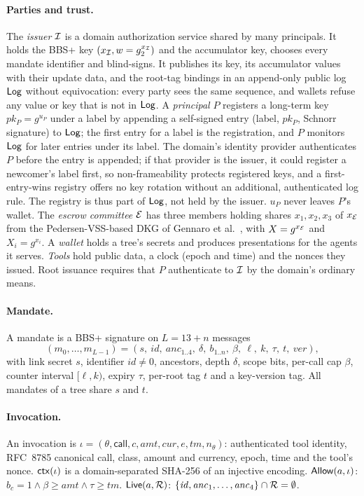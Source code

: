 \paragraph{Parties and trust.} The \emph{issuer} $\mathcal{I}$ is a domain authorization service shared by many principals. It holds the BBS+ key $(x_{\mathcal{I}}, w=g_2^{x_{\mathcal{I}}})$ and the accumulator key, chooses every mandate identifier and blind-signs. It publishes its key, its accumulator values with their update data, and the root-tag bindings in an append-only public log $\mathsf{Log}$ without equivocation: every party sees the same sequence, and wallets refuse any value or key that is not in $\mathsf{Log}$. A \emph{principal} $P$ registers a long-term key $pk_P=g^{u_P}$ under a label by appending a self-signed entry (label, $pk_P$, Schnorr signature) to $\mathsf{Log}$; the first entry for a label is the registration, and $P$ monitors $\mathsf{Log}$ for later entries under its label. The domain's identity provider authenticates $P$ before the entry is appended; if that provider is the issuer, it could register a newcomer's label first, so non-frameability protects registered keys, and a first-entry-wins registry offers no key rotation without an additional, authenticated log rule. The registry is thus part of $\mathsf{Log}$, not held by the issuer. $u_P$ never leaves $P$'s wallet. The \emph{escrow committee} $\mathcal{E}$ has three members holding shares $x_1,x_2,x_3$ of $x_{\mathcal{E}}$ from the Pedersen-VSS-based DKG of Gennaro et al.~\cite{gennaro2007dkg}, with $X=g^{x_{\mathcal{E}}}$ and $X_i=g^{x_i}$. A \emph{wallet} holds a tree's secrets and produces presentations for the agents it serves. \emph{Tools} hold public data, a clock (epoch and time) and the nonces they issued. Root issuance requires that $P$ authenticate to $\mathcal{I}$ by the domain's ordinary means.

\paragraph{Mandate.} A mandate is a BBS+ signature on $L=13+n$ messages
\[
(m_0,\dots,m_{L-1})=(s,\ \mathit{id},\ \mathit{anc}_{1..4},\ \delta,\ b_{1..n},\ \beta,\ \ell,\ k,\ \tau,\ t,\ \mathit{ver}),
\]
with link secret $s$, identifier $\mathit{id}\neq0$, ancestors, depth $\delta$, scope bits, per-call cap $\beta$, counter interval $[\ell,k)$, expiry $\tau$, per-root tag $t$ and a key-version tag. All mandates of a tree share $s$ and $t$.

\paragraph{Invocation.} An invocation is $\iota=(\theta,\mathsf{call},c,\mathit{amt},\mathit{cur},e,\mathit{tm},n_\theta)$: authenticated tool identity, RFC~8785 canonical call, class, amount and currency, epoch, time and the tool's nonce. $\mathsf{ctx}(\iota)$ is a domain-separated SHA-256 of an injective encoding. $\mathsf{Allow}(a,\iota)$: $b_c=1\wedge\beta\ge\mathit{amt}\wedge\tau\ge\mathit{tm}$. $\mathsf{Live}(a,\mathcal{R})$: $\{\mathit{id},\mathit{anc}_1,\dots,\mathit{anc}_4\}\cap\mathcal{R}=\emptyset$.

